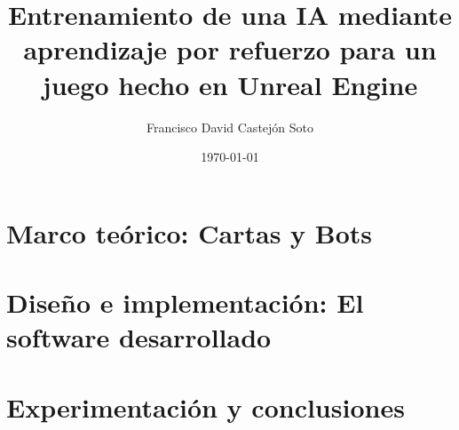 \documentclass[11pt, a4paper]{book}
\author{Francisco David Castejón Soto}
\title{Entrenamiento de una IA mediante aprendizaje por refuerzo para un juego hecho en Unreal Engine}
\date{\today}
\begin{document}
\frontmatter





\cleardoublepage
\tableofcontents

\cleardoublepage
\listoffigures

\cleardoublepage
\listoftables

\mainmatter

\part{Marco teórico: Cartas y Bots} \label{part:idea}






\part{Diseño e implementación: El software desarrollado} \label{part:preparacion}



\part{Experimentación y conclusiones} \label{part:resultados}




\backmatter

\cleardoublepage



% 
\end{document}
